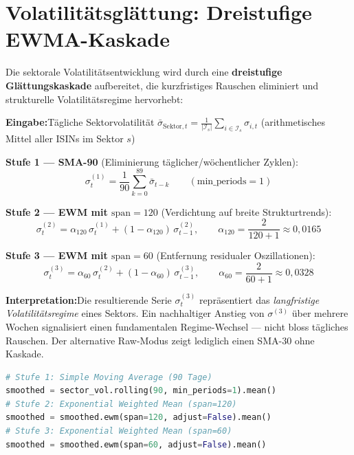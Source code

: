 \documentclass[11pt, a4paper, oneside, openany]{report}
\newcommand{\code}[1]{\texttt{\small\textcolor{DeepNavy}{#1}}}
\begin{document}
\section{Volatilitätsglättung: Dreistufige EWMA-Kaskade}
\label{sec:ewma}

Die sektorale Volatilitätsentwicklung wird durch eine \textbf{dreistufige Glättungskaskade} aufbereitet, die kurzfristiges Rauschen eliminiert und strukturelle Volatilitätsregime hervorhebt:

\begin{mathbox}
\textbf{Eingabe:}\;Tägliche Sektorvolatilität $\bar{\sigma}_{\text{Sektor},t} = \frac{1}{|\mathcal{I}_s|}\sum_{i \in \mathcal{I}_s} \sigma_{i,t}$ (arithmetisches Mittel aller ISINs im Sektor $s$)

\textbf{Stufe 1 --- SMA-90} (Eliminierung täglicher/wöchentlicher Zyklen):
\[
  \sigma_t^{(1)} = \frac{1}{90}\sum_{k=0}^{89} \bar{\sigma}_{t-k} \qquad (\text{min\_periods} = 1)
\]

\textbf{Stufe 2 --- EWM mit $\text{span}=120$} (Verdichtung auf breite Strukturtrends):
\[
  \sigma_t^{(2)} = \alpha_{120}\,\sigma_t^{(1)} + (1 - \alpha_{120})\,\sigma_{t-1}^{(2)}, \qquad \alpha_{120} = \frac{2}{120 + 1} \approx 0{,}0165
\]

\textbf{Stufe 3 --- EWM mit $\text{span}=60$} (Entfernung residualer Oszillationen):
\[
  \sigma_t^{(3)} = \alpha_{60}\,\sigma_t^{(2)} + (1 - \alpha_{60})\,\sigma_{t-1}^{(3)}, \qquad \alpha_{60} = \frac{2}{60 + 1} \approx 0{,}0328
\]

\textbf{Interpretation:}\;Die resultierende Serie $\sigma_t^{(3)}$ repräsentiert das \textit{langfristige Volatilitätsregime} eines Sektors. Ein nachhaltiger Anstieg von $\sigma^{(3)}$ über mehrere Wochen signalisiert einen fundamentalen Regime-Wechsel --- nicht bloss tägliches Rauschen. Der alternative Raw-Modus zeigt lediglich einen SMA-30 ohne Kaskade.
\end{mathbox}

\begin{lstlisting}[language=Python, caption={Dreistufige EWMA-Kaskade in Pandas (\code{charts.py})}]
# Stufe 1: Simple Moving Average (90 Tage)
smoothed = sector_vol.rolling(90, min_periods=1).mean()
# Stufe 2: Exponential Weighted Mean (span=120)
smoothed = smoothed.ewm(span=120, adjust=False).mean()
# Stufe 3: Exponential Weighted Mean (span=60)
smoothed = smoothed.ewm(span=60, adjust=False).mean()
\end{lstlisting}
\end{document}
